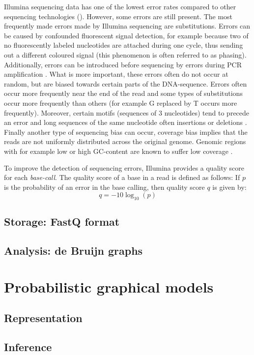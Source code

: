 Illumina sequencing data has one of the lowest error rates compared to other sequencing technologies (). However, some errors are still present. The most frequently made errors made by Illumina sequencing are substitutions. Errors can be caused by confounded fluorescent signal detection, for example because two of no fluorescently labeled nucleotides are attached during one cycle, thus sending out a different coloured signal (this phenomenon is often referred to as phasing). Additionally, errors can be introduced before sequencing by errors during PCR amplification \cite{Pfeiffer2018}. 
What is more important, these errors often do not occur at random, but are biased towards certain parts of the DNA-sequence. Errors often occur more frequently near the end of the read and some types of substitutions occur more frequently than others (for example G replaced by T occurs more frequently). Moreover, certain motifs (sequences of 3 nucleotides) tend to precede an error and long sequences of the same nucleotide often insertions or deletions \cite{Schirmer2016}. 
Finally another type of sequencing bias can occur, coverage bias implies that the reads are not uniformly distributed across the original genome. Genomic regions with for example low or high GC-content are known to suffer low coverage \cite{Ross2013}.

To improve the detection of sequencing errors, Illumina provides a quality score for each \emph{base-call}.
The quality score of a base in a read is defined as follows:
If $p$ is the probability of an error in the base calling, then quality score $q$ is given by: \[
	q = -10 \log_{10}(p)
\]

\subsection{Storage: FastQ format}

\subsection{Analysis: de Bruijn graphs}

\section{Probabilistic graphical models}

\subsection{Representation}

\subsection{Inference}

